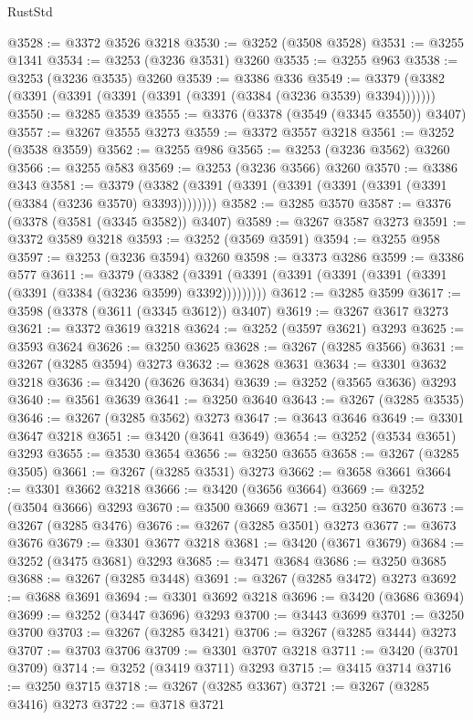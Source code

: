 \begin{lexlean}{RustStd}
\begin{coremodule}
@3528 := @3372 @3526 @3218
@3530 := @3252 (@3508 @3528)
@3531 := @3255 @1341
@3534 := @3253 (@3236 @3531) @3260
@3535 := @3255 @963
@3538 := @3253 (@3236 @3535) @3260
@3539 := @3386 @336
@3549 := @3379 (@3382 (@3391 (@3391 (@3391 (@3391 (@3391 (@3384 (@3236 @3539) @3394)))))))
@3550 := @3285 @3539
@3555 := @3376 (@3378 (@3549 (@3345 @3550)) @3407)
@3557 := @3267 @3555 @3273
@3559 := @3372 @3557 @3218
@3561 := @3252 (@3538 @3559)
@3562 := @3255 @986
@3565 := @3253 (@3236 @3562) @3260
@3566 := @3255 @583
@3569 := @3253 (@3236 @3566) @3260
@3570 := @3386 @343
@3581 := @3379 (@3382 (@3391 (@3391 (@3391 (@3391 (@3391 (@3391 (@3384 (@3236 @3570) @3393))))))))
@3582 := @3285 @3570
@3587 := @3376 (@3378 (@3581 (@3345 @3582)) @3407)
@3589 := @3267 @3587 @3273
@3591 := @3372 @3589 @3218
@3593 := @3252 (@3569 @3591)
@3594 := @3255 @958
@3597 := @3253 (@3236 @3594) @3260
@3598 := @3373 @3286
@3599 := @3386 @577
@3611 := @3379
    (@3382 (@3391 (@3391 (@3391 (@3391 (@3391 (@3391 (@3391 (@3384 (@3236 @3599) @3392)))))))))
@3612 := @3285 @3599
@3617 := @3598 (@3378 (@3611 (@3345 @3612)) @3407)
@3619 := @3267 @3617 @3273
@3621 := @3372 @3619 @3218
@3624 := @3252 (@3597 @3621) @3293
@3625 := @3593 @3624
@3626 := @3250 @3625
@3628 := @3267 (@3285 @3566)
@3631 := @3267 (@3285 @3594) @3273
@3632 := @3628 @3631
@3634 := @3301 @3632 @3218
@3636 := @3420 (@3626 @3634)
@3639 := @3252 (@3565 @3636) @3293
@3640 := @3561 @3639
@3641 := @3250 @3640
@3643 := @3267 (@3285 @3535)
@3646 := @3267 (@3285 @3562) @3273
@3647 := @3643 @3646
@3649 := @3301 @3647 @3218
@3651 := @3420 (@3641 @3649)
@3654 := @3252 (@3534 @3651) @3293
@3655 := @3530 @3654
@3656 := @3250 @3655
@3658 := @3267 (@3285 @3505)
@3661 := @3267 (@3285 @3531) @3273
@3662 := @3658 @3661
@3664 := @3301 @3662 @3218
@3666 := @3420 (@3656 @3664)
@3669 := @3252 (@3504 @3666) @3293
@3670 := @3500 @3669
@3671 := @3250 @3670
@3673 := @3267 (@3285 @3476)
@3676 := @3267 (@3285 @3501) @3273
@3677 := @3673 @3676
@3679 := @3301 @3677 @3218
@3681 := @3420 (@3671 @3679)
@3684 := @3252 (@3475 @3681) @3293
@3685 := @3471 @3684
@3686 := @3250 @3685
@3688 := @3267 (@3285 @3448)
@3691 := @3267 (@3285 @3472) @3273
@3692 := @3688 @3691
@3694 := @3301 @3692 @3218
@3696 := @3420 (@3686 @3694)
@3699 := @3252 (@3447 @3696) @3293
@3700 := @3443 @3699
@3701 := @3250 @3700
@3703 := @3267 (@3285 @3421)
@3706 := @3267 (@3285 @3444) @3273
@3707 := @3703 @3706
@3709 := @3301 @3707 @3218
@3711 := @3420 (@3701 @3709)
@3714 := @3252 (@3419 @3711) @3293
@3715 := @3415 @3714
@3716 := @3250 @3715
@3718 := @3267 (@3285 @3367)
@3721 := @3267 (@3285 @3416) @3273
@3722 := @3718 @3721

\end{coremodule}
\end{lexlean}
